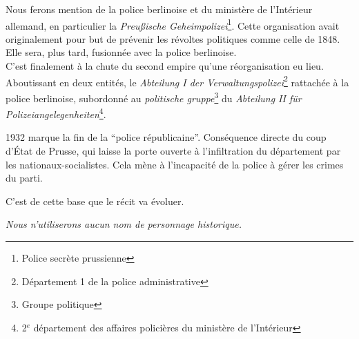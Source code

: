 Nous ferons mention de la police berlinoise et du ministère de l'Intérieur allemand, 
en particulier la \textit{Preußische Geheimpolizei}\footnote{Police secrète prussienne}.
Cette organisation avait originalement pour but de prévenir les révoltes politiques comme celle de 1848.
Elle sera, plus tard, fusionnée avec la police berlinoise.\\ 

C'est finalement à la chute du second empire qu'une réorganisation eu lieu. 
Aboutissant en deux entités, le \textit{Abteilung I der Verwaltungspolizei}\footnote{Département 1 de la police administrative}
rattachée à la police berlinoise, subordonné au \textit{politische gruppe}\footnote{Groupe politique} du \textit{Abteilung II für Polizeiangelegenheiten}\footnote{2$^e$ département des affaires policières du ministère de l'Intérieur}.

1932 marque la fin de la \enquote{police républicaine}. Conséquence directe du coup d'État de Prusse, 
qui laisse la porte ouverte à l'infiltration du département par les nationaux-socialistes. 
Cela mène à l'incapacité de la police à gérer les crimes du parti.

C'est de cette base que le récit va évoluer.

\textit{Nous n'utiliserons aucun nom de personnage historique.}